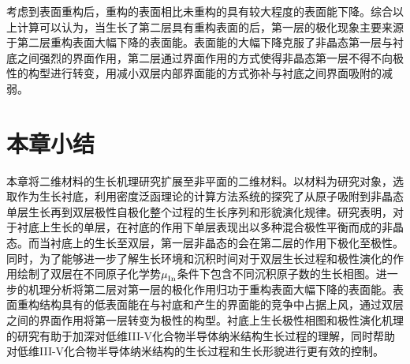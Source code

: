 考虑到表面重构后，重构的表面相比未重构的具有较大程度的表面能下降。综合以上计算可以认为，当生长了第二层具有重构表面的后，第一层的极化现象主要来源于第二层重构表面大幅下降的表面能。表面能的大幅下降克服了非晶态第一层与衬底之间强烈的界面作用，第二层通过界面作用的方式使得非晶态第一层不得不向极性的构型进行转变，用减小双层内部界面能的方式弥补与衬底之间界面吸附的减弱。

\section{本章小结}
本章将二维材料的生长机理研究扩展至非平面的二维材料。以材料为研究对象，选取作为生长衬底，利用密度泛函理论的计算方法系统的探究了从原子吸附到非晶态单层生长再到双层极性自极化整个过程的生长序列和形貌演化规律。研究表明，对于衬底上生长的单层，在衬底的作用下单层表现出以多种混合极性平衡而成的非晶态。而当衬底上的生长至双层，第一层非晶态的会在第二层的作用下极化至极性。同时，为了能够进一步了解生长环境和沉积时间对于双层生长过程和极性演化的作用绘制了双层在不同原子化学势$\it \mu_{\rm In}^{\rm } \it$条件下包含不同沉积原子数的生长相图。进一步的机理分析将第二层对第一层的极化作用归功于重构表面大幅下降的表面能。表面重构结构具有的低表面能在与衬底和产生的界面能的竞争中占据上风，通过双层之间的界面作用将第一层转变为极性的构型。衬底上生长极性相图和极性演化机理的研究有助于加深对低维III-V化合物半导体纳米结构生长过程的理解，同时帮助对低维III-V化合物半导体纳米结构的生长过程和生长形貌进行更有效的控制。